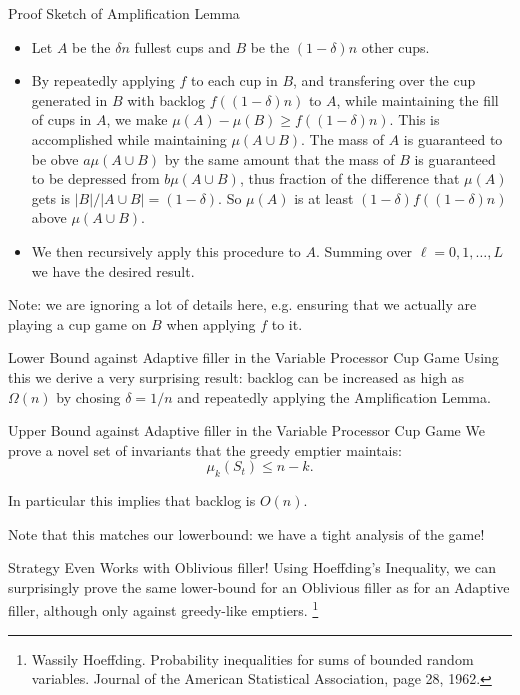 \documentclass[xcolor=x11names, svgnames, rgb]{beamer}
\begin{document}
\begin{frame}[t]{Proof Sketch of Amplification Lemma}
  \begin{itemize}
    \item Let $A$ be the $\delta n$ fullest cups and $B$ be the $(1-\delta)n$ other cups.
    \item By repeatedly applying $f$ to each cup in $B$, and transfering over
      the cup generated in $B$ with backlog $f((1-\delta)n)$ to $A$, while maintaining the fill of cups in $A$, we make
      $\mu (A) - \mu (B) \ge f((1-\delta)n)$. This is accomplished while
      maintaining $\mu(A\cup B)$. The mass of $A$ is guaranteed to be obve
      $a\mu(A\cup B)$ by the same amount that the mass of $B$ is guaranteed to
      be depressed from $b\mu(A\cup B)$, thus fraction of the difference that
      $\mu(A)$ gets is $|B|/|A\cup B| = (1-\delta)$. So $\mu(A)$ is at least
      $(1-\delta)f((1-\delta)n)$ above $\mu(A\cup B)$.
    \item We then recursively apply this procedure to $A$. Summing over $\ell = 0,1, \ldots, L$ we have the desired result.
  \end{itemize} 

  Note: we are ignoring a lot of details here, e.g. ensuring that we actually are playing a cup game on $B$ when applying $f$ to it.
\end{frame}

\begin{frame}[t]{Lower Bound against Adaptive filler in the Variable Processor Cup Game}
  Using this we derive a very surprising result: backlog can be increased as
  high as $\Omega(n)$ by chosing $\delta = 1/n$ and repeatedly applying the
  Amplification Lemma.
  
\end{frame}

\begin{frame}[t]{Upper Bound against Adaptive filler in the Variable Processor Cup Game}
  We prove a novel set of invariants that the greedy emptier maintais: 
  $$\mu_k(S_t) \le n-k.$$

  \vspace{0.3cm}
  In particular this implies that backlog is $O(n)$. 

  \vspace{0.3cm}
  Note that this matches our lowerbound: we have a tight analysis of the game!
  
\end{frame}

\begin{frame}[t]{Strategy Even Works with Oblivious filler!}
  Using Hoeffding's Inequality, we can surprisingly prove the same lower-bound
  for an Oblivious filler as for an Adaptive filler, although only against
  greedy-like emptiers.
  \footnote{Wassily Hoeffding. Probability inequalities for sums of bounded random variables. Journal of the American Statistical Association, page 28, 1962.}
\end{frame}
\end{document}

